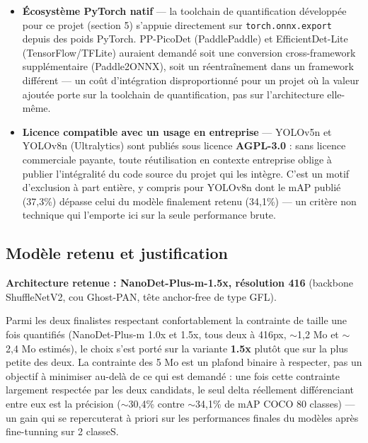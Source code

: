 \documentclass[11pt,a4paper]{article}
\let\Oldsubsection\subsection
\renewcommand{\subsection}{\FloatBarrier\Oldsubsection}
\begin{document}
    \begin{itemize}[leftmargin=1.5em]
      \item \textbf{Écosystème PyTorch natif} --- la toolchain de
        quantification développée pour ce projet (section 5) s'appuie
        directement sur \texttt{torch.onnx.export} depuis des poids
        PyTorch. PP-PicoDet (PaddlePaddle) et EfficientDet-Lite
        (TensorFlow/TFLite) auraient demandé soit une conversion
        cross-framework supplémentaire (Paddle2ONNX), soit un
        réentraînement dans un framework différent --- un coût
        d'intégration disproportionné pour un projet où la valeur ajoutée
        porte sur la toolchain de quantification, pas sur l'architecture
        elle-même.
      \item \textbf{Licence compatible avec un usage en entreprise} ---
        YOLOv5n et YOLOv8n (Ultralytics) sont publiés sous licence
        \textbf{AGPL-3.0} : sans licence commerciale payante, toute
        réutilisation en contexte entreprise oblige à publier l'intégralité
        du code source du projet qui les intègre. C'est un motif
        d'exclusion à part entière, y compris pour YOLOv8n dont le mAP
        publié (37,3\%) dépasse celui du modèle finalement retenu (34,1\%)
        --- un critère non technique qui l'emporte ici sur la seule
        performance brute.
    \end{itemize}
    
    
    \subsection{Modèle retenu et justification}
    
    \textbf{Architecture retenue : NanoDet-Plus-m-1.5x, résolution 416}
    (backbone ShuffleNetV2, cou Ghost-PAN, tête anchor-free de type GFL).
    
    Parmi les deux finalistes respectant confortablement la contrainte de
    taille une fois quantifiés (NanoDet-Plus-m 1.0x et 1.5x, tous deux à
    416px, $\sim$1,2 Mo et $\sim$2,4 Mo estimés), le choix s'est porté sur
    la variante \textbf{1.5x} plutôt que sur la plus petite des deux. La
    contrainte des 5 Mo est un plafond binaire à respecter, pas un objectif
    à minimiser au-delà de ce qui est demandé : une fois cette contrainte
    largement respectée par les deux candidats, le seul delta réellement
    différenciant entre eux est la précision ($\sim$30,4\% contre
    $\sim$34,1\% de mAP COCO 80 classes) --- un gain qui se repercuterat à priori sur les performances finales du modèles après fine-tunning sur 2 classeS.
    
\end{document}
